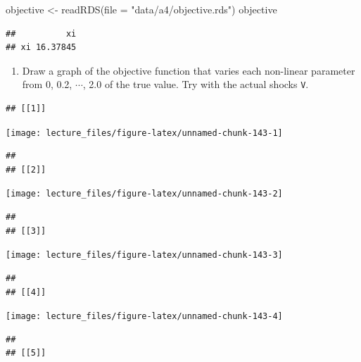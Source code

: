 \documentclass[
]{book}
\newenvironment{Shaded}{\begin{snugshade}}{\end{snugshade}}
\newcommand{\AttributeTok}[1]{\textcolor[rgb]{0.77,0.63,0.00}{#1}}
\newcommand{\FunctionTok}[1]{\textcolor[rgb]{0.00,0.00,0.00}{#1}}
\newcommand{\NormalTok}[1]{#1}
\newcommand{\OtherTok}[1]{\textcolor[rgb]{0.56,0.35,0.01}{#1}}
\newcommand{\StringTok}[1]{\textcolor[rgb]{0.31,0.60,0.02}{#1}}
\providecommand{\tightlist}{%
  \setlength{\itemsep}{0pt}\setlength{\parskip}{0pt}}
\begin{document}
\begin{Shaded}
\begin{Highlighting}[]
\NormalTok{objective }\OtherTok{\textless{}{-}} \FunctionTok{readRDS}\NormalTok{(}\AttributeTok{file =} \StringTok{"data/a4/objective.rds"}\NormalTok{)}
\NormalTok{objective}
\end{Highlighting}
\end{Shaded}

\begin{verbatim}
##          xi
## xi 16.37845
\end{verbatim}

\begin{enumerate}
\def\labelenumi{\arabic{enumi}.}
\setcounter{enumi}{11}
\tightlist
\item
  Draw a graph of the objective function that varies each non-linear parameter from 0, 0.2, \(\cdots\), 2.0 of the true value. Try with the actual shocks \texttt{V}.
\end{enumerate}

\begin{verbatim}
## [[1]]
\end{verbatim}

\begin{center}\texttt{[image: lecture\_files/figure-latex/unnamed-chunk-143-1]} \end{center}

\begin{verbatim}
## 
## [[2]]
\end{verbatim}

\begin{center}\texttt{[image: lecture\_files/figure-latex/unnamed-chunk-143-2]} \end{center}

\begin{verbatim}
## 
## [[3]]
\end{verbatim}

\begin{center}\texttt{[image: lecture\_files/figure-latex/unnamed-chunk-143-3]} \end{center}

\begin{verbatim}
## 
## [[4]]
\end{verbatim}

\begin{center}\texttt{[image: lecture\_files/figure-latex/unnamed-chunk-143-4]} \end{center}

\begin{verbatim}
## 
## [[5]]
\end{verbatim}
\end{document}
